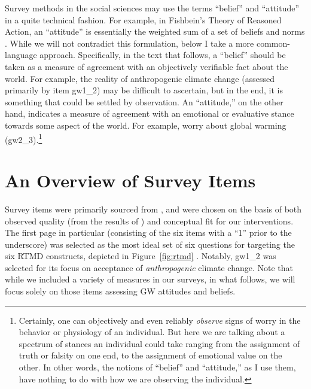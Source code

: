 Survey methods in the social sciences may use the terms “belief” and “attitude”
in a quite technical fashion. For example, in Fishbein's Theory of Reasoned
Action, an “attitude” is essentially the weighted sum of a set of beliefs and
norms \parencite[see][for an overview of such theories]{montano_theory_2008}.
While we will not contradict this formulation, below I take a more
common-language approach. Specifically, in the text that follows, a “belief”
should be taken as a measure of agreement with an objectively verifiable fact
about the world. For example, the reality of anthropogenic climate change
(assessed primarily by item \textsf{gw1_2}) may be difficult to ascertain, but
in the end, it is something that could be settled by observation.  An
“attitude,” on the other hand, indicates a measure of agreement with an
emotional or evaluative stance towards some aspect of the world.  For example,
worry about global warming (\textsf{gw2_3}).\footnote{Certainly, one can
    objectively and even reliably \emph{observe} signs of worry in the behavior
    or physiology of an individual. But here we are talking about a spectrum of
    stances an individual could take ranging from the assignment of truth or
    falsity on one end, to the assignment of emotional value on the other. In
    other words, the notions of “belief” and “attitude,” as I use them, have
    nothing to do with how we are observing the individual.}
    
\section{An Overview of Survey Items}

Survey items were primarily sourced from \textcite{martinez_factors_2009}, and
were chosen on the basis of both observed quality (from the results of
) and conceptual fit for our interventions. The
first page in particular (consisting of the six items with a “1” prior to the
underscore) was selected as the most ideal set of six questions for targeting the
six RTMD constructs, depicted in Figure~\ref{fig:rtmd}
\parencite{ranney_why_2012}.  Notably, \textsf{gw1_2} was selected for its focus
on acceptance of \emph{anthropogenic} climate change. Note that while we
included a variety of measures in our surveys, in what follows, we will focus
solely on those items assessing GW attitudes and beliefs.

